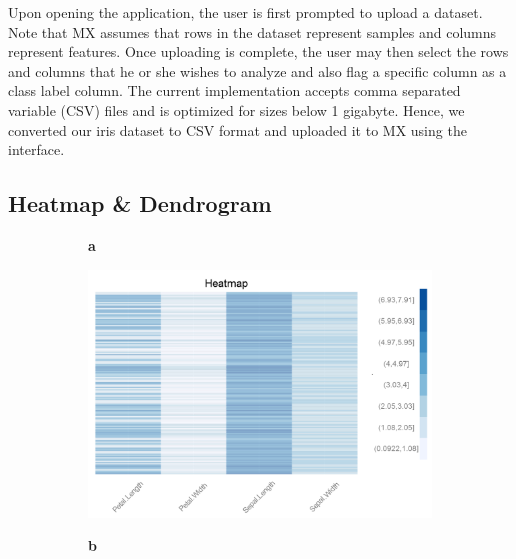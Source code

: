 \documentclass[review]{siamart0516}
\begin{document}
Upon opening the application, the user is first prompted to upload a dataset. Note that MX assumes that rows in the dataset represent samples and columns represent features. Once uploading is complete, the user may then select the rows and columns that he or she wishes to analyze and also flag a specific column as a class label column. The current implementation accepts comma separated variable (CSV) files and is optimized for sizes below 1 gigabyte. Hence, we converted our iris dataset to CSV format and uploaded it to MX using the interface.

\subsection{Heatmap \& Dendrogram}
\label{subsec:SubSecHeatmap}

\begin{figure}[t!]
	\centering
	\begin{subfigure}[t]{0.01\textwidth}
		\textbf{a}
	\end{subfigure}
	\begin{subfigure}[t]{0.46\textwidth}
		\includegraphics[width=\textwidth,valign=t]{Figures/Iris/HeatmapRawnodendro.png}
		\subcaption{}
		\label{fig:FigHeatmapRawnodendro}
	\end{subfigure}\hfill
	\begin{subfigure}[t]{0.01\textwidth}
		\textbf{b}
	\end{subfigure}
	\begin{subfigure}[t]{0.46\textwidth}

\end{subfigure}
\end{figure}
\end{document}
